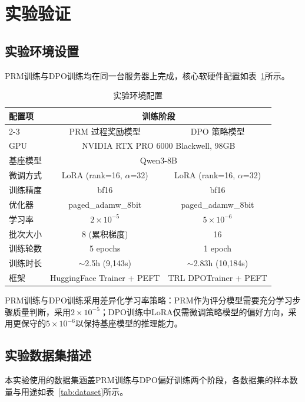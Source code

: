 \documentclass[professional,privacy,print,win,long,STEM,AutoFakeBold]{def/buaa}
\begin{document}
\section{实验验证}
\subsection{实验环境设置}

PRM训练与DPO训练均在同一台服务器上完成，核心软硬件配置如表~\ref{tab:exp-env}所示。

\begin{table}[h]
\centering
\caption{实验环境配置}
\label{tab:exp-env}
\begin{tabular}{lcc}
\toprule
\multirow{2}{*}{配置项} & \multicolumn{2}{c}{训练阶段} \\
\cmidrule(lr){2-3}
& PRM 过程奖励模型 & DPO 策略模型 \\
\midrule
GPU & \multicolumn{2}{c}{NVIDIA RTX PRO 6000 Blackwell, 98GB} \\
基座模型 & \multicolumn{2}{c}{Qwen3-8B} \\
微调方式 & LoRA (rank=16, $\alpha$=32) & LoRA (rank=16, $\alpha$=32) \\
训练精度 & bf16 & bf16 \\
优化器 & paged\_adamw\_8bit & paged\_adamw\_8bit \\
学习率 & $2\times10^{-5}$ & $5\times10^{-6}$ \\
批次大小 & 8 (累积梯度) & 16 \\
训练轮数 & 5 epochs & 1 epoch \\
训练时长 & $\sim$2.5h (9,143s) & $\sim$2.83h (10,184s) \\
框架 & HuggingFace Trainer + PEFT & TRL DPOTrainer + PEFT \\
\bottomrule
\end{tabular}
\end{table}

PRM训练与DPO训练采用差异化学习率策略：PRM作为评分模型需要充分学习步骤质量判断，采用$2\times10^{-5}$；DPO训练中LoRA仅需微调策略模型的偏好方向，采用更保守的$5\times10^{-6}$以保持基座模型的推理能力。

\subsection{实验数据集描述}

本实验使用的数据集涵盖PRM训练与DPO偏好训练两个阶段，各数据集的样本数量与用途如表~\ref{tab:dataset}所示。
\end{document}
